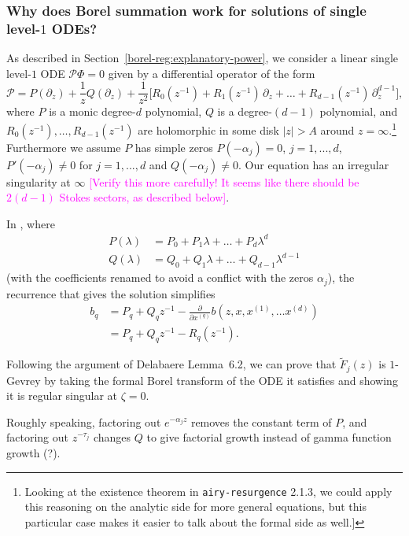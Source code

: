 \documentclass{article}
\theoremstyle{definition}
\newcommand{\series}[1]{\tilde{#1}}
\begin{document}
\subsubsection{Why does Borel summation work for solutions of single level-$1$ ODEs?}
As described in Section~\ref{borel-reg:explanatory-power}, we consider a linear single level-$1$ ODE $\mathcal{P}\Phi = 0$ given by a differential operator of the form
\begin{equation}\label{eqn:standard ODE}
\mathcal{P} = P(\partial_z) + \frac{1}{z} Q(\partial_z) + \frac{1}{z^2}\big[ R_0(z^{-1}) + R_1(z^{-1})\,\partial_z + \ldots + R_{d-1}(z^{-1})\,\partial_z^{d-1} \big],
\end{equation}
where $P$ is a monic degree-$d$ polynomial, $Q$ is a degree-$(d-1)$ polynomial, and $R_0(z^{-1}), \ldots, R_{d-1}(z^{-1})$ are holomorphic in some disk $|z| > A$ around $z = \infty$.\footnote{Looking at the existence theorem in {\tt airy-resurgence} 2.1.3, we could apply this reasoning on the analytic side for more general equations, but this particular case makes it easier to talk about the formal side as well.]} Furthermore we assume $P$ has simple zeros $P(-\alpha_j)=0$, $j=1,...,d$, $P'(-\alpha_j)\neq 0$ for $j=1,...,d$ and $Q(-\alpha_j)\neq 0$. Our equation has an irregular singularity at $\infty$ \textcolor{magenta}{[Verify this more carefully! It seems like there should be $2(d-1)$ Stokes sectors, as described below]}.

\color{DarkTurquoise}
In \cite[Proposition~2.2.7]{EcalleIII}, where
\begin{align*}
P(\lambda) & = P_0 + P_1 \lambda + \ldots + P_d \lambda^d \\
Q(\lambda) & = Q_0 + Q_1 \lambda + \ldots + Q_{d-1} \lambda^{d-1}
\end{align*}
(with the coefficients renamed to avoid a conflict with the zeros $\alpha_j$), the recurrence that gives the solution simplifies
\begin{align*} b_q & = P_q + Q_q z^{-1} - \frac{\partial}{\partial x^{(q)}} b(z, x, x^{(1)}, \ldots x^{(d)}) \\
& = P_q + Q_q z^{-1} - R_q(z^{-1}).
\end{align*}

Following the argument of Delabaere Lemma~6.2, we can prove that $\series{F}_j(z)$ is $1$-Gevrey by taking the formal Borel transform of the ODE it satisfies and showing it is regular singular at $\zeta=0$. 

Roughly speaking, factoring out $e^{-\alpha_j z}$ removes the constant term of $P$, and factoring out $z^{-\tau_j}$ changes $Q$ to give factorial growth instead of gamma function growth (?).
\end{document}

